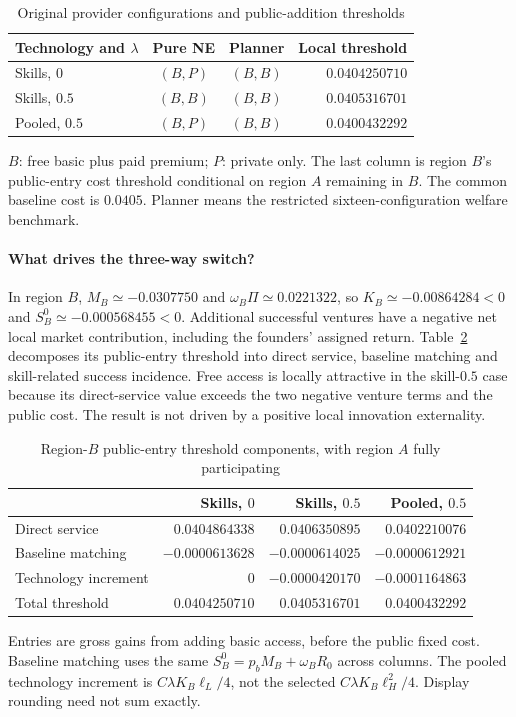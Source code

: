 \documentclass[11pt]{article}
\begin{document}
\begin{table}[htbp]\centering
\caption{Original provider configurations and public-addition thresholds}\label{tab:entry}
\begin{tabular}{@{}lccr@{}}\toprule
Technology and $\lambda$ & Pure NE & Planner & Local threshold\\\midrule
Skills, $0$ & $(B,P)$ & $(B,B)$ & $0.0404250710$\\
Skills, $0.5$ & $(B,B)$ & $(B,B)$ & $0.0405316701$\\
Pooled, $0.5$ & $(B,P)$ & $(B,B)$ & $0.0400432292$\\\bottomrule
\end{tabular}
\par\smallskip\footnotesize $B$: free basic plus paid premium; $P$: private only. The last column is region $B$'s public-entry cost threshold conditional on region $A$ remaining in $B$. The common baseline cost is $0.0405$. Planner means the restricted sixteen-configuration welfare benchmark.
\end{table}

\paragraph{What drives the three-way switch?}
In region $B$, $M_B\simeq-0.0307750$ and $\omega_B\Pi\simeq0.0221322$, so $K_B\simeq-0.00864284<0$ and $S_B^0\simeq-0.000568455<0$.
Additional successful ventures have a negative net local market contribution, including the founders' assigned return.
Table~\ref{tab:diagnostic} decomposes its public-entry threshold into direct service, baseline matching and skill-related success incidence.
Free access is locally attractive in the skill-$0.5$ case because its direct-service value exceeds the two negative venture terms and the public cost.
The result is not driven by a positive local innovation externality.

\begin{table}[htbp]\centering\small
\caption{Region-$B$ public-entry threshold components, with region $A$ fully participating}\label{tab:diagnostic}
\begin{tabular}{@{}lrrr@{}}\toprule
 & Skills, $0$ & Skills, $0.5$ & Pooled, $0.5$\\\midrule
Direct service & $0.0404864338$ & $0.0406350895$ & $0.0402210076$\\
Baseline matching & $-0.0000613628$ & $-0.0000614025$ & $-0.0000612921$\\
Technology increment & $0$ & $-0.0000420170$ & $-0.0001164863$\\\midrule
Total threshold & $0.0404250710$ & $0.0405316701$ & $0.0400432292$\\\bottomrule
\end{tabular}
\par\smallskip\footnotesize Entries are gross gains from adding basic access, before the public fixed cost. Baseline matching uses the same $S_B^0=p_bM_B+\omega_BR_0$ across columns. The pooled technology increment is $C\lambda K_B\ell_L/4$, not the selected $C\lambda K_B\ell_H^2/4$. Display rounding need not sum exactly.
\end{table}
\end{document}
